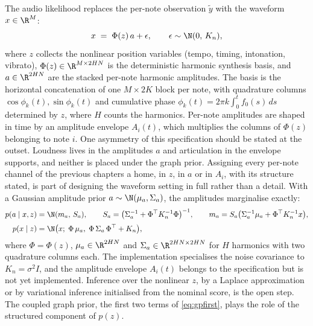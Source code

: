 The audio likelihood replaces the per-note observation $\tilde y$ with the
waveform $x \in \R^{M}$:
\begin{equation}
  x \;=\; \Phi(z)\, a + \epsilon, \qquad \epsilon \sim \N(0,\, K_n),
  \label{eq:waveform}
\end{equation}
where $z$ collects the nonlinear position variables (tempo, timing,
intonation, vibrato), $\Phi(z) \in \R^{M \times 2HN}$ is the deterministic
harmonic synthesis basis, and $a \in \R^{2HN}$ are the stacked per-note
harmonic amplitudes. The basis is the horizontal concatenation of one
$M \times 2K$ block per note, with quadrature columns
$\cos\phi_k(t), \sin\phi_k(t)$ and cumulative phase
$\phi_k(t) = 2\pi k \int_0^t f_0(s)\, ds$ determined by $z$, where $H$ counts
the harmonics. Per-note amplitudes are shaped in time by an amplitude
envelope $A_i(t)$, which multiplies the columns of $\Phi(z)$ belonging to
note $i$. One asymmetry of this specification should be stated at the
outset. Loudness lives in the amplitudes $a$ and articulation in the
envelope supports, and neither is placed under the graph prior. Assigning
every per-note channel of the previous chapters a home, in $z$, in $a$ or
in $A_i$, with its structure stated, is part of designing the waveform
setting in full rather than a detail. With a Gaussian amplitude prior
$a \sim \N(\mu_a, \Sigma_a)$, the amplitudes marginalise exactly:
\begin{align}
  p(a \mid x, z) &= \N(m_a,\, S_a), \qquad
  S_a = \bigl( \Sigma_a^{-1} + \Phi^\top K_n^{-1} \Phi \bigr)^{-1}, \qquad
  m_a = S_a \bigl( \Sigma_a^{-1} \mu_a + \Phi^\top K_n^{-1} x \bigr),
  \label{eq:amp-post}\\[2pt]
  p(x \mid z) &= \N\bigl( x;\; \Phi\, \mu_a,\; \Phi\, \Sigma_a\, \Phi^\top + K_n \bigr),
  \label{eq:collapsed}
\end{align}
where $\Phi = \Phi(z)$, $\mu_a \in \R^{2HN}$ and
$\Sigma_a \in \R^{2HN \times 2HN}$ for $H$ harmonics with two quadrature
columns each. The implementation specialises the noise covariance to
$K_n = \sigma^2 I$, and the amplitude envelope $A_i(t)$ belongs to the
specification but is not yet implemented. Inference over the nonlinear $z$,
by a Laplace approximation or by variational inference initialised from the
nominal score, is the open step. The coupled graph prior, the first two
terms of \eqref{eq:gpfirst}, plays the role of the structured component of
$p(z)$.


